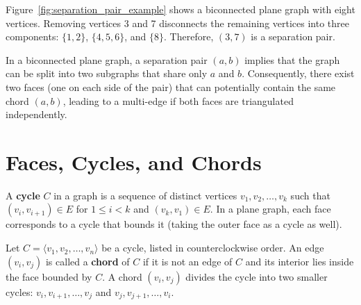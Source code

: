 Figure~\ref{fig:separation_pair_example} shows a biconnected plane graph with eight vertices. 
Removing vertices 3 and 7 disconnects the remaining vertices into three components: \(\{1,2\}\), \(\{4,5,6\}\), and \(\{8\}\). 
Therefore, \((3,7)\) is a separation pair.

\begin{remark}
    In a biconnected plane graph, a separation pair \((a,b)\) implies that the graph can be split into two subgraphs that share only \(a\) and \(b\). 
    Consequently, there exist two faces (one on each side of the pair) that can potentially contain the same chord \((a,b)\), leading to a multi-edge if both faces are triangulated independently.
\end{remark}

\section{Faces, Cycles, and Chords}
\label{sec:faces_cycles_chords}

A \textbf{cycle} \(C\) in a graph is a sequence of distinct vertices \(v_1, v_2, \ldots, v_k\) such that \((v_i, v_{i+1}) \in E\) for \(1 \le i < k\) and \((v_k, v_1) \in E\). 
In a plane graph, each face corresponds to a cycle that bounds it (taking the outer face as a cycle as well).

Let \(C = \langle v_1, v_2, \ldots, v_n \rangle\) be a cycle, listed in counterclockwise order. 
An edge \((v_i, v_j)\) is called a \textbf{chord} of \(C\) if it is not an edge of \(C\) and its interior lies inside the face bounded by \(C\). 
A chord \((v_i, v_j)\) divides the cycle into two smaller cycles: 
\(v_i, v_{i+1}, \ldots, v_j\) and \(v_j, v_{j+1}, \ldots, v_i\).

